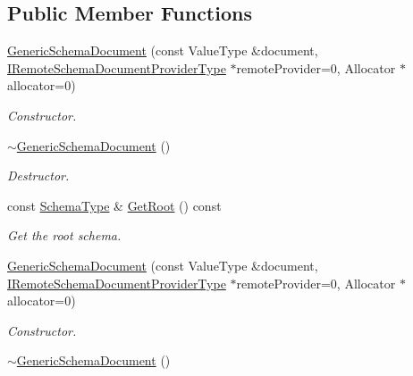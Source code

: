 \subsection*{Public Member Functions}
\begin{DoxyCompactItemize}
\item 
\hyperlink{class_generic_schema_document_a5577c9b9a7a898207a50db891388231c}{Generic\+Schema\+Document} (const Value\+Type \&document, \hyperlink{class_i_generic_remote_schema_document_provider}{I\+Remote\+Schema\+Document\+Provider\+Type} $\ast$remote\+Provider=0, Allocator $\ast$allocator=0)
\begin{DoxyCompactList}\small\item\em Constructor. \end{DoxyCompactList}\item 
\hyperlink{class_generic_schema_document_a6a54dfd1aec0f560f7e47e08f3fcb8f1}{$\sim$\+Generic\+Schema\+Document} ()\hypertarget{class_generic_schema_document_a6a54dfd1aec0f560f7e47e08f3fcb8f1}{}\label{class_generic_schema_document_a6a54dfd1aec0f560f7e47e08f3fcb8f1}

\begin{DoxyCompactList}\small\item\em Destructor. \end{DoxyCompactList}\item 
const \hyperlink{classinternal_1_1_schema}{Schema\+Type} \& \hyperlink{class_generic_schema_document_a4975a5a422acfa221997046a7d28c344}{Get\+Root} () const \hypertarget{class_generic_schema_document_a4975a5a422acfa221997046a7d28c344}{}\label{class_generic_schema_document_a4975a5a422acfa221997046a7d28c344}

\begin{DoxyCompactList}\small\item\em Get the root schema. \end{DoxyCompactList}\item 
\hyperlink{class_generic_schema_document_a5577c9b9a7a898207a50db891388231c}{Generic\+Schema\+Document} (const Value\+Type \&document, \hyperlink{class_i_generic_remote_schema_document_provider}{I\+Remote\+Schema\+Document\+Provider\+Type} $\ast$remote\+Provider=0, Allocator $\ast$allocator=0)
\begin{DoxyCompactList}\small\item\em Constructor. \end{DoxyCompactList}\item 
\hyperlink{class_generic_schema_document_a6a54dfd1aec0f560f7e47e08f3fcb8f1}{$\sim$\+Generic\+Schema\+Document} ()\hypertarget{class_generic_schema_document_a6a54dfd1aec0f560f7e47e08f3fcb8f1}{}\label{class_generic_schema_document_a6a54dfd1aec0f560f7e47e08f3fcb8f1}


\end{DoxyCompactItemize}
